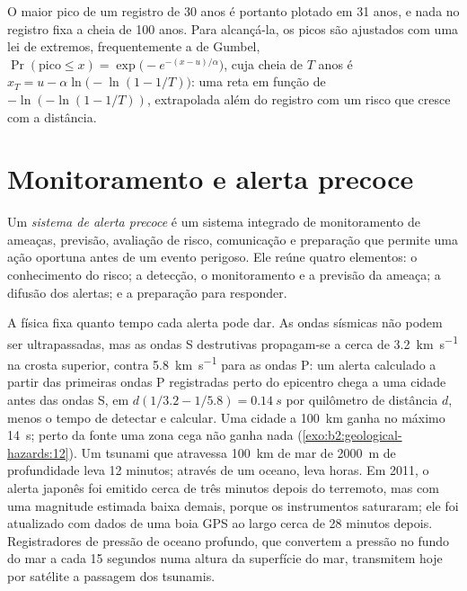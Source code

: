 O maior pico de um registro de 30 anos é portanto plotado em 31 anos, e nada no registro fixa
a cheia de 100 anos. Para alcançá-la, os picos são ajustados com uma lei de extremos, frequentemente a de Gumbel,
$\Pr(\text{pico} \leq x) = \exp\bigl(-e^{-(x - u)/\alpha}\bigr)$, cuja cheia de $T$ anos é $x_T = u
- \alpha\ln\bigl(-\ln(1 - 1/T)\bigr)$: uma reta em função de $-\ln(-\ln(1 - 1/T))$, extrapolada
além do registro com um risco que cresce com a distância.

\section{Monitoramento e alerta precoce}\label{sec:b2:geological-hazards:warning}

\begin{definition}\label{def:b2:geological-hazards:warning}
Um \emph{sistema de alerta precoce} é um sistema integrado de monitoramento
de ameaças, previsão, avaliação de risco, comunicação e preparação que permite uma
ação oportuna antes de um evento perigoso. Ele reúne quatro elementos: o conhecimento do risco; a detecção,
o monitoramento e a previsão da ameaça; a difusão dos alertas; e a preparação para
responder.
\end{definition}

A física fixa quanto tempo cada alerta pode dar. As ondas sísmicas não podem ser ultrapassadas, mas as ondas S
destrutivas propagam-se a cerca de \qty{3.2}{km.s^{-1}} na crosta superior, contra \qty{5.8}{km.s^{-1}} para
as ondas P: um alerta calculado a partir das primeiras ondas P registradas perto do epicentro chega a uma cidade
antes das ondas S, em $d(1/3.2 - 1/5.8) = \qty{0.14}{s}$ por quilômetro de distância $d$, menos o
tempo de detectar e calcular. Uma cidade a \qty{100}{km} ganha no máximo \qty{14}{s}; perto da fonte uma
zona cega não ganha nada (\cref{exo:b2:geological-hazards:12}). Um tsunami que atravessa \qty{100}{km} de mar
de \qty{2000}{m} de profundidade leva 12 minutos; através de um oceano, leva horas. Em 2011, o alerta
japonês foi emitido cerca de três minutos depois do terremoto, mas com uma magnitude estimada baixa demais,
porque os instrumentos saturaram; ele foi atualizado com dados de uma boia GPS ao largo cerca de 28 minutos depois.
Registradores de pressão de oceano profundo, que convertem a pressão no fundo do mar a cada 15 segundos numa
altura da superfície do mar, transmitem hoje por satélite a passagem dos tsunamis.

